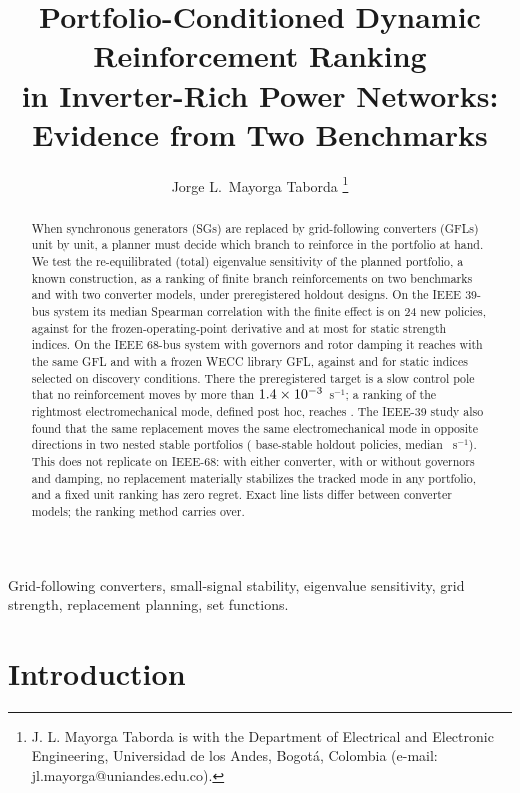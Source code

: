 \documentclass[journal]{IEEEtran}
\title{Portfolio-Conditioned Dynamic Reinforcement Ranking\\ in Inverter-Rich
Power Networks: Evidence from Two Benchmarks}
\author{Jorge L.~Mayorga Taborda%
\thanks{J. L. Mayorga Taborda is with the Department of Electrical and
Electronic Engineering, Universidad de los Andes, Bogot\'a, Colombia
(e-mail: jl.mayorga@uniandes.edu.co).}%
}
\theoremstyle{remark}
\begin{document}
\maketitle

\begin{abstract}
When synchronous generators (SGs) are replaced by grid-following converters
(GFLs) unit by unit, a planner must decide which branch to reinforce in the
portfolio at hand. We test the re-equilibrated (total) eigenvalue sensitivity of
the planned portfolio, a known construction, as a ranking of finite branch
reinforcements on two benchmarks and with two converter models, under
preregistered holdout designs. On the IEEE 39-bus system its median Spearman
correlation with the finite effect is \gbnewpoliciesmedianrhoDtotal{} on 24 new
policies, against \gbnewpoliciesmedianrhoDfrozen{} for the frozen-operating-point
derivative and at most \gbnewpoliciesmedianrhooraclestatic{} for static strength
indices. On the IEEE 68-bus system with governors and rotor damping it reaches
\sxRhoA{} with the same GFL and \sxRhoB{} with a frozen WECC library GFL, against
\sxStatA{} and \sxStatB{} for static indices selected on discovery conditions.
There the preregistered target is a slow control pole that no reinforcement moves
by more than $1.4\times10^{-3}$~s$^{-1}$; a ranking of the rightmost
electromechanical mode, defined post hoc, reaches \sxEmRho. The IEEE-39 study also
found that the same replacement moves the same electromechanical mode in opposite
directions in two nested stable portfolios (\cntDNew{} base-stable holdout
policies, median \revDmed~s$^{-1}$). This does not replicate on IEEE-68: with
either converter, with or without governors and damping, no replacement
materially stabilizes the tracked mode in any portfolio, and a fixed unit ranking
has zero regret. Exact line lists differ between converter models; the ranking
method carries over.
\end{abstract}

\begin{IEEEkeywords}
Grid-following converters, small-signal stability, eigenvalue sensitivity,
grid strength, replacement planning, set functions.
\end{IEEEkeywords}

\section{Introduction}
\end{document}
